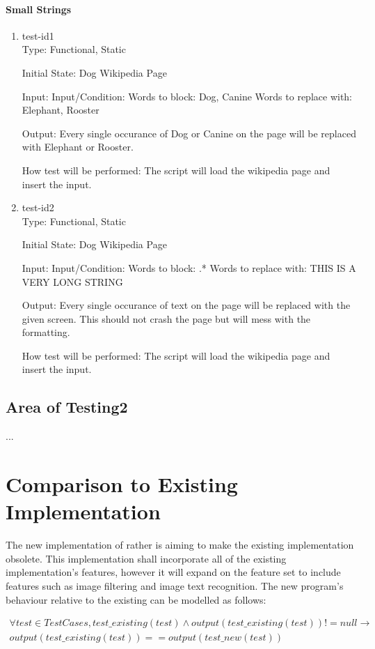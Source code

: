\documentclass[12pt, titlepage]{article}
\begin{document}
\paragraph{Small Strings}
\begin{enumerate}
\item{test-id1\\}
Type: Functional, Static
					
Initial State: Dog Wikipedia Page
					
Input: Input/Condition: Words to block: Dog, Canine
Words to replace with: Elephant, Rooster
					
Output: Every single occurance of Dog or Canine on the page will be replaced with Elephant or Rooster.
					
How test will be performed: The script will load the wikipedia page and insert the input. 
					
\item{test-id2\\}
Type: Functional, Static
					
Initial State: Dog Wikipedia Page
					
Input: Input/Condition: Words to block: .*
Words to replace with: THIS IS A VERY LONG STRING

Output: Every single occurance of text on the page will be replaced with the given screen. This should not crash the page but will mess with the formatting.
					
How test will be performed: The script will load the wikipedia page and insert the input.
\end{enumerate}
\subsection{Area of Testing2}
...
	
\section{Comparison to Existing Implementation}
The new implementation of rather is aiming to make the existing implementation obsolete. This implementation shall incorporate all of the existing implementation's features, however it will expand on the feature set to include features such as image filtering and image text recognition. The new program's behaviour relative to the existing can be modelled as follows:

\begin{multline}
\forall test \in TestCases, test\_existing(test) \wedge output(test\_existing(test)) != null  \rightarrow  \\ 
output(test\_existing(test)) == output(test\_new(test))
\end{multline}
\end{document}
